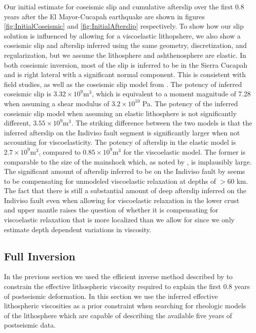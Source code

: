 \documentclass[12pt]{article}
\begin{document}
Our initial estimate for coseismic slip and cumulative afterslip over the first 0.8 years after the El Mayor-Cucapah earthquake are shown in figures \ref{fig:InitialCoseismic} and \ref{fig:InitialAfterslip} respectively. To show how our slip solution is influenced by allowing for a viscoelastic lithopshere, we also show a coseismic slip and afterslip inferred using the same geometry, discretization, and regularization, but we assume the lithosphere and ashthenosphere are elastic.  In both coseismic inversion, most of the slip is inferred to be in the Sierra Cucapah and is right lateral with a significant normal component. This is consistent with field studies, \cite{Fletcher2014} as well as the coseismic slip model from \cite{Wei2011}.  The potency of inferred coseismic slip is $3.32\times 10^{9} \mathrm{m}^3$, which is equivalent to a moment magnitude of 7.28 when assuming a shear modulus of $3.2\times10^{10}$ Pa. The potency of the inferred coseismic slip model when assuming an elastic lithosphere is not significantly different, $3.55\times 10^9 \mathrm{m}^3$.  The striking difference between the two models is that the inferred afterslip on the Indiviso fault segment is significantly larger when not accounting for viscoelasticity.  The potency of afterslip in the elastic model is $2.7\times 10^9 \mathrm{m}^3$, compared to $0.85\times 10^9 \mathrm{m}^3$ for the viscoelastic model.  The former is comparable to the size of the mainshock which, as noted by \cite{Rollins2015}, is implausibly large. The significant amount of afterslip inferred to be on the Indiviso fault by \cite{Rollins2015} seems to be compensating for unmodeled viscoelastic relaxation at depths of $>60$ km.   The fact that there is still a substantial amount of deep afterslip inferred on the Indiviso fault even when allowing for viscoelastic relaxation in the lower crust and upper mantle raises the question of whether it is compensating for viscoelastic relaxation that is more localized than we allow for since we only estimate depth dependent variations in viscosity.  
 
 
\subsection{Full Inversion}\label{FullInversion} 

In the previous section we used the efficient inverse method described by \cite{Hines2015} to constrain the effective lithospheric viscosity required to explain the first 0.8 years of postseismic deformation. In this section we use the inferred effective lithospheric viscosities as a prior constraint when searching for rheologic models of the lithosphere which are capable of describing the available five years of postseismic data.   
\end{document}
